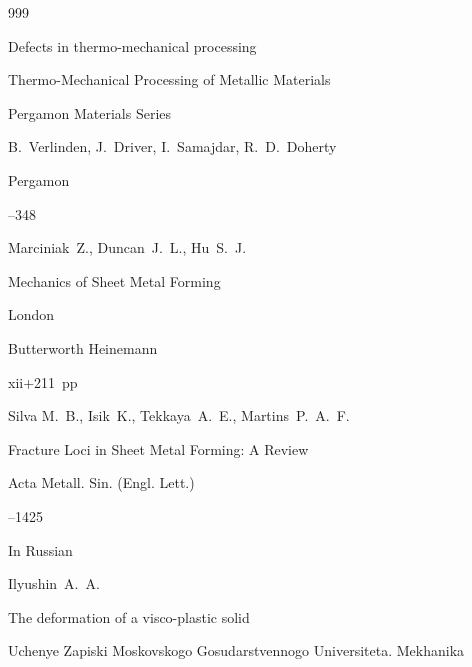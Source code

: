 \begin{thebibliography}{999}




\paper Defects in thermo-mechanical processing

\inbook Thermo-Mechanical Processing of Metallic Materials

\serial Pergamon Materials Series

\eds B.~Verlinden, J.~Driver, I.~Samajdar, R.~D.~Doherty 



\publaddr Pergamon

--348





\by Marciniak~Z., Duncan~J.~L., Hu~S.~J.  

\book Mechanics of Sheet Metal Forming 


\publaddr London

\publ Butterworth Heinemann

\totalpages xii+211~pp \nofrills





\by Silva M.~B., Isik~K., Tekkaya~A.~E., Martins~P.~A.~F. 

\paper Fracture Loci in Sheet Metal Forming: A Review

\jour   Acta Metall. Sin. (Engl. Lett.)




--1425






\lang In Russian

\by Ilyushin~A.~A. 

\paper The deformation of a visco-plastic solid 

\jour Uchenye Zapiski Moskovskogo Gosudarstvennogo Universiteta. Mekhanika


\end{thebibliography}
